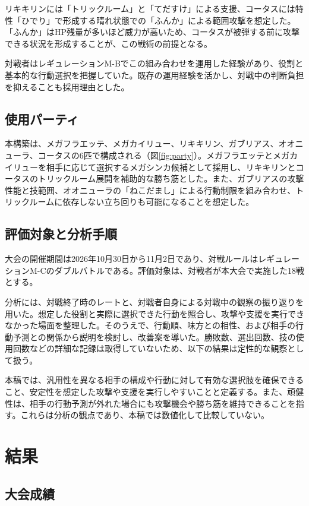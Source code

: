 \documentclass[a4paper,10pt]{ltjsarticle}
\begin{document}
リキキリンには「トリックルーム」と「てだすけ」による支援、コータスには特性「ひでり」で形成する晴れ状態での「ふんか」による範囲攻撃を想定した。「ふんか」はHP残量が多いほど威力が高いため、コータスが被弾する前に攻撃できる状況を形成することが、この戦術の前提となる。

対戦者はレギュレーションM-Bでこの組み合わせを運用した経験があり、役割と基本的な行動選択を把握していた。既存の運用経験を活かし、対戦中の判断負担を抑えることも採用理由とした。

\subsection{使用パーティ}

本構築は、メガフラエッテ、メガカイリュー、リキキリン、ガブリアス、オオニューラ、コータスの6匹で構成される（図\ref{fig:party}）。メガフラエッテとメガカイリューを相手に応じて選択するメガシンカ候補として採用し、リキキリンとコータスのトリックルーム展開を補助的な勝ち筋とした。また、ガブリアスの攻撃性能と技範囲、オオニューラの「ねこだまし」による行動制限を組み合わせ、トリックルームに依存しない立ち回りも可能になることを想定した。

\subsection{評価対象と分析手順}

大会の開催期間は2026年10月30日から11月2日であり、対戦ルールはレギュレーションM-Cのダブルバトルである\cite{pjcs}。評価対象は、対戦者が本大会で実施した18戦とする。

分析には、対戦終了時のレートと、対戦者自身による対戦中の観察の振り返りを用いた。想定した役割と実際に選択できた行動を照合し、攻撃や支援を実行できなかった場面を整理した。そのうえで、行動順、味方との相性、および相手の行動予測との関係から説明を検討し、改善案を導いた。勝敗数、選出回数、技の使用回数などの詳細な記録は取得していないため、以下の結果は定性的な観察として扱う。

本稿では、汎用性を異なる相手の構成や行動に対して有効な選択肢を確保できること、安定性を想定した攻撃や支援を実行しやすいことと定義する。また、頑健性は、相手の行動予測が外れた場合にも攻撃機会や勝ち筋を維持できることを指す。これらは分析の観点であり、本稿では数値化して比較していない。

\section{結果}
\subsection{大会成績}
\end{document}
